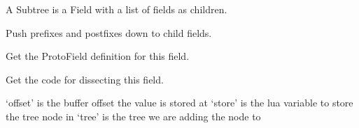 \documentclass[A4paper,10pt,english]{sphinxmanual}
\begin{document}
\begin{fulllineitems}
\label{devel/code:field.Subtree}
A Subtree is a Field with a list of fields as children.

\begin{fulllineitems}
\label{devel/code:field.Subtree.push_modifiers}
Push prefixes and postfixes down to child fields.

\end{fulllineitems}


\begin{fulllineitems}
\label{devel/code:field.Subtree.get_definition}
Get the ProtoField definition for this field.

\end{fulllineitems}


\begin{fulllineitems}
\label{devel/code:field.Subtree.get_code}
Get the code for dissecting this field.

`offset' is the buffer offset the value is stored at
`store' is the lua variable to store the tree node in
`tree' is the tree we are adding the node to

\end{fulllineitems}


\end{fulllineitems}

\end{document}
